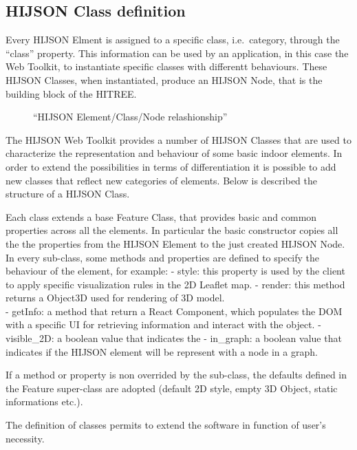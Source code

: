\documentclass{sig-alternate}
\begin{document}
\subsection{HIJSON Class definition}\label{hijson-class-definition}

Every HIJSON Elment is assigned to a specific class, i.e.~category, through the ``class'' property. This information can be used by an application, in this case the Web Toolkit, to instantiate specific classes with differentt behaviours. These HIJSON Classes, when instantiated, produce an HIJSON Node, that is the building block of the HITREE.

\begin{figure}
\centering
{}
\caption{``HIJSON Element/Class/Node relashionship''}
\label{fig:elem-class-node-rel}
\end{figure}

The HIJSON Web Toolkit provides a number of HIJSON Classes that are used to characterize the representation and behaviour of some basic indoor elements. In order to extend the possibilities in terms of differentiation it is possible to add new classes that reflect new categories of elements. Below is described the structure of a HIJSON Class.

Each class extends a base Feature Class, that provides basic and common properties across all the elements. In particular the basic constructor copies all the the properties from the HIJSON Element to the just created HIJSON Node. In every sub-class, some methods and properties are defined to specify the behaviour of the element, for example: - style: this property is used by the client to apply specific visualization rules in the 2D Leaflet map. - render: this method returns a Object3D used for rendering of 3D model.\\- getInfo: a method that return a React Component, which populates the DOM with a specific UI for retrieving information and interact with the object. - visible\_2D: a boolean value that indicates the - in\_graph: a boolean value that indicates if the HIJSON element will be represent with a node in a graph.

If a method or property is non overrided by the sub-class, the defaults defined in the Feature super-class are adopted (default 2D style, empty 3D Object, static informations etc.).

The definition of classes permits to extend the software in function of user's necessity.
\end{document}

